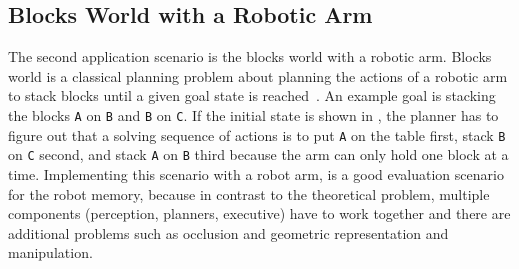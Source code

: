 \subsection{Blocks World with a Robotic Arm}
\label{sec:app-blocks-world}
The second application scenario is the blocks world with a robotic
arm. Blocks world is a classical planning problem about planning the
actions of a robotic arm to stack blocks until a given goal state is
reached~\cite{blocks-world}. An example goal is stacking the blocks \texttt{A} on
\texttt{B} and \texttt{B} on \texttt{C}. If the initial state is shown
in , the planner has to figure out that a solving sequence of
actions is to put \texttt{A} on the table first, stack \texttt{B} on
\texttt{C} second, and stack \texttt{A} on
\texttt{B} third because the arm can only hold one block at a time.
Implementing this scenario with a robot arm, is a good evaluation
scenario for the robot memory, because in contrast to the theoretical
problem, multiple components (perception, planners, executive)
have to work together and there are additional problems such as
occlusion and geometric representation and manipulation.
